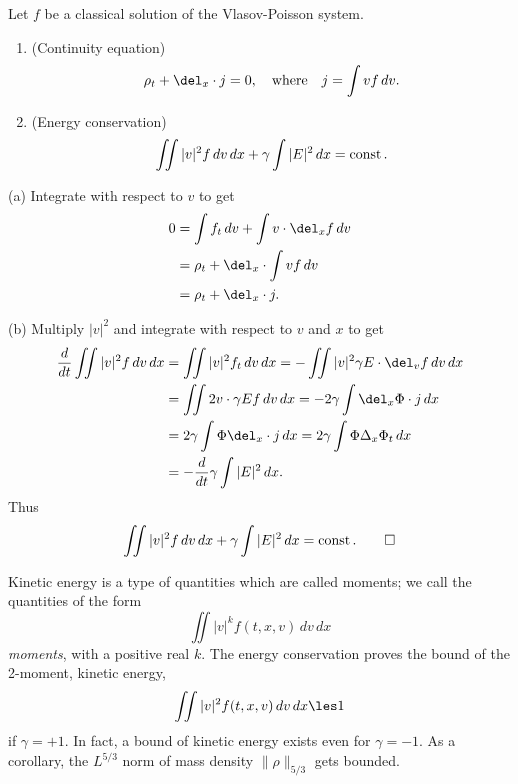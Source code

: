\documentclass[11pt]{amsart}
\begin{document}
\begin{lem}
Let $f$ be a classical solution of the Vlasov-Poisson system.
\begin{enumerate}
\item(Continuity equation)
\[\rho_t+\del_x\cdot j=0,\quad\text{where}\quad j=\int vf\,dv.\]
\item(Energy conservation)
\[\iint|v|^2f\,dv\,dx+\gamma\int|E|^2\,dx=\operatorname{const}.\]
\end{enumerate}
\end{lem}
\begin{pf}
(a)
Integrate with respect to $v$ to get
\begin{align*}
0&=\int f_t\,dv+\int v\cdot\del_xf\,dv\\
&=\rho_t+\del_x\cdot\int vf\,dv\\
&=\rho_t+\del_x\cdot j.
\end{align*}

(b)
Multiply $|v|^2$ and integrate with respect to $v$ and $x$ to get
\begin{align*}
\dd{t}\iint|v|^2f\,dv\,dx
&=\iint|v|^2f_t\,dv\,dx=-\iint|v|^2\gamma E\cdot\del_vf\,dv\,dx\\
&=\iint2v\cdot\gamma Ef\,dv\,dx=-2\gamma\int\del_x\Phi\cdot j\,dx\\
&=2\gamma\int\Phi\del_x\cdot j\,dx=2\gamma\int\Phi\Delta_x\Phi_t\,dx\\
&=-\dd{t}\gamma\int|E|^2\,dx.
\end{align*}
Thus
\[\iint|v|^2f\,dv\,dx+\gamma\int|E|^2\,dx=\operatorname{const}.\qedhere\]
\end{pf}

Kinetic energy is a type of quantities which are called moments;
we call the quantities of the form
\[\iint|v|^kf(t,x,v)\,dv\,dx\]
\emph{moments}, with a positive real $k$.
The energy conservation proves the bound of the 2-moment, kinetic energy,
\[\iint|v|^2f(t,x,v)\,dv\,dx\les1\]
if $\gamma=+1$.
In fact, a bound of kinetic energy exists even for $\gamma=-1$.
As a corollary, the $L^{5/3}$ norm of mass density $\|\rho\|_{5/3}$ gets bounded.
\end{document}
